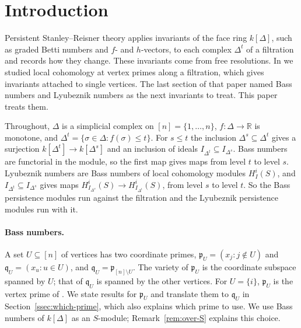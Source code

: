 \documentclass[11pt]{article}
\theoremstyle{plain}
\theoremstyle{definition}
\newcommand{\kk}{k}
\newcommand{\RR}{\mathbb{R}}
\newcommand{\pp}{\mathfrak{p}}
\newcommand{\Hloc}[2]{H^{#1}_{#2}}
\begin{document}
\section{Introduction}\label{sec:intro}

Persistent Stanley--Reisner theory \cite{SuwayyidWeiPSRT,SuwayyidWeiGraphs} applies invariants of
the face ring $\kk[\Delta]$, such as graded Betti numbers and $f$- and $h$-vectors, to each complex
$\Delta^t$ of a filtration and records how they change. These invariants come from free resolutions.
In \cite{HeSuwayyidWei} we studied local cohomology at vertex primes along a filtration, which gives
invariants attached to single vertices. The last section of that paper named Bass numbers and
Lyubeznik numbers as the next invariants to treat. This paper treats them.

Throughout, $\Delta$ is a simplicial complex on $[n]=\{1,\dots,n\}$, $f\colon\Delta\to\RR$ is
monotone, and $\Delta^t=\{\sigma\in\Delta:f(\sigma)\le t\}$. For $s\le t$ the inclusion
$\Delta^s\subseteq\Delta^t$ gives a surjection $\kk[\Delta^t]\to\kk[\Delta^s]$ and an inclusion of
ideals $I_{\Delta^t}\subseteq I_{\Delta^s}$. Bass numbers are functorial in the module, so the first
map gives maps from level $t$ to level $s$. Lyubeznik numbers are Bass numbers of local cohomology
modules $\Hloc{i}{I}(S)$, and $I_{\Delta^t}\subseteq I_{\Delta^s}$ gives maps
$\Hloc{i}{I_{\Delta^s}}(S)\to\Hloc{i}{I_{\Delta^t}}(S)$, from level $s$ to level $t$. So the Bass
persistence modules run against the filtration and the Lyubeznik persistence modules run with it.

\paragraph{Bass numbers.} A set $U\subseteq[n]$ of vertices has two coordinate primes,
$\pp_U=(x_j:j\notin U)$ and $\mathfrak q_U=(x_u:u\in U)$, and $\mathfrak q_U=\pp_{[n]\setminus U}$. The variety of
$\pp_U$ is the coordinate subspace spanned by $U$; that of $\mathfrak q_U$ is spanned by the other vertices. For
$U=\{i\}$, $\pp_U$ is the vertex prime of \cite{HeSuwayyidWei}. We state results for $\pp_U$ and translate
them to $\mathfrak q_U$ in Section~\ref{ssec:which-prime}, which also explains which prime to use. We use Bass
numbers of $\kk[\Delta]$ as an $S$-module; Remark~\ref{rem:over-S} explains this choice.
\end{document}
